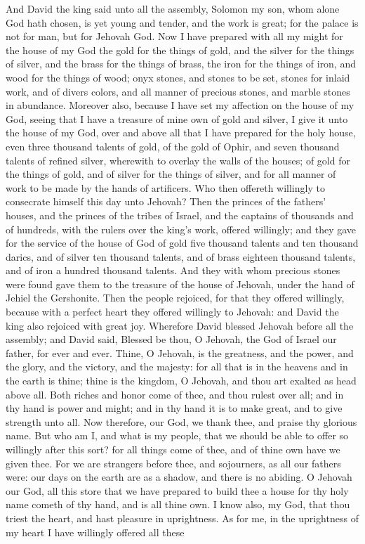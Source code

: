 And David the king said unto all the assembly, Solomon my son, whom alone God hath chosen, is yet young and tender, and the work is great; for the palace is not for man, but for Jehovah God. Now I have prepared with all my might for the house of my God the gold for the things of gold, and the silver for the things of silver, and the brass for the things of brass, the iron for the things of iron, and wood for the things of wood; onyx stones, and stones to be set, stones for inlaid work, and of divers colors, and all manner of precious stones, and marble stones in abundance. Moreover also, because I have set my affection on the house of my God, seeing that I have a treasure of mine own of gold and silver, I give it unto the house of my God, over and above all that I have prepared for the holy house, even three thousand talents of gold, of the gold of Ophir, and seven thousand talents of refined silver, wherewith to overlay the walls of the houses; of gold for the things of gold, and of silver for the things of silver, and for all manner of work to be made by the hands of artificers. Who then offereth willingly to consecrate himself this day unto Jehovah?  Then the princes of the fathers’ houses, and the princes of the tribes of Israel, and the captains of thousands and of hundreds, with the rulers over the king’s work, offered willingly; and they gave for the service of the house of God of gold five thousand talents and ten thousand darics, and of silver ten thousand talents, and of brass eighteen thousand talents, and of iron a hundred thousand talents. And they with whom precious stones were found gave them to the treasure of the house of Jehovah, under the hand of Jehiel the Gershonite. Then the people rejoiced, for that they offered willingly, because with a perfect heart they offered willingly to Jehovah: and David the king also rejoiced with great joy.  Wherefore David blessed Jehovah before all the assembly; and David said, Blessed be thou, O Jehovah, the God of Israel our father, for ever and ever. Thine, O Jehovah, is the greatness, and the power, and the glory, and the victory, and the majesty: for all that is in the heavens and in the earth is thine; thine is the kingdom, O Jehovah, and thou art exalted as head above all. Both riches and honor come of thee, and thou rulest over all; and in thy hand is power and might; and in thy hand it is to make great, and to give strength unto all. Now therefore, our God, we thank thee, and praise thy glorious name. But who am I, and what is my people, that we should be able to offer so willingly after this sort? for all things come of thee, and of thine own have we given thee. For we are strangers before thee, and sojourners, as all our fathers were: our days on the earth are as a shadow, and there is no abiding. O Jehovah our God, all this store that we have prepared to build thee a house for thy holy name cometh of thy hand, and is all thine own. I know also, my God, that thou triest the heart, and hast pleasure in uprightness. As for me, in the uprightness of my heart I have willingly offered all these 